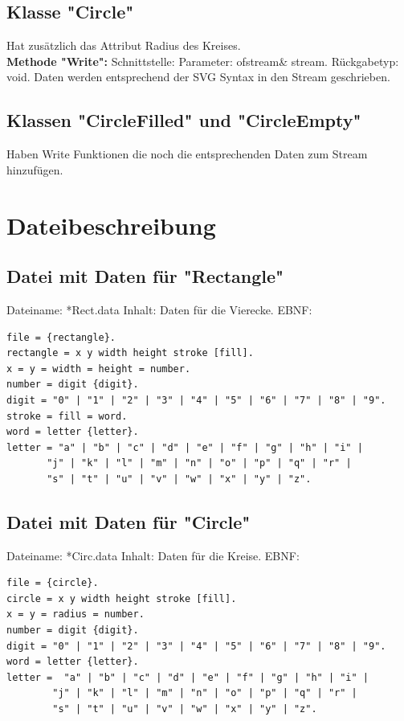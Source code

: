 \documentclass[12pt,a4paper]{article}
\begin{document}
\subsection {Klasse "Circle"}
Hat zusätzlich das Attribut Radius des Kreises.
\\

\textbf {Methode "Write": } 
\newline
Schnittstelle:
Parameter: ofstream\& stream.
\newline
Rückgabetyp: void.
\newline
Daten werden entsprechend der SVG Syntax in den Stream geschrieben.
\\

\subsection {Klassen "CircleFilled" und "CircleEmpty"}
Haben Write Funktionen die noch die entsprechenden Daten zum Stream hinzufügen.
\\

\newpage
\section {Dateibeschreibung}
\subsection {Datei mit Daten für "Rectangle"}
Dateiname: *Rect.data
\newline
Inhalt: Daten für die Vierecke.
\newline
EBNF:
\begin{verbatim}
file = {rectangle}.
rectangle = x y width height stroke [fill].
x = y = width = height = number.
number = digit {digit}.
digit = "0" | "1" | "2" | "3" | "4" | "5" | "6" | "7" | "8" | "9".
stroke = fill = word.
word = letter {letter}.
letter = "a" | "b" | "c" | "d" | "e" | "f" | "g" | "h" | "i" | 
	   "j" | "k" | "l" | "m" | "n" | "o" | "p" | "q" | "r" | 
	   "s" | "t" | "u" | "v" | "w" | "x" | "y" | "z".
\end{verbatim}


\subsection {Datei mit Daten für "Circle"}
Dateiname: *Circ.data
\newline
Inhalt: Daten für die Kreise.
\newline
EBNF:
\begin{verbatim}
file = {circle}.
circle = x y width height stroke [fill].
x = y = radius = number.
number = digit {digit}.
digit = "0" | "1" | "2" | "3" | "4" | "5" | "6" | "7" | "8" | "9".
word = letter {letter}.
letter =  "a" | "b" | "c" | "d" | "e" | "f" | "g" | "h" | "i" | 
	    "j" | "k" | "l" | "m" | "n" | "o" | "p" | "q" | "r" | 
	    "s" | "t" | "u" | "v" | "w" | "x" | "y" | "z".
\end{verbatim}
\end{document}
